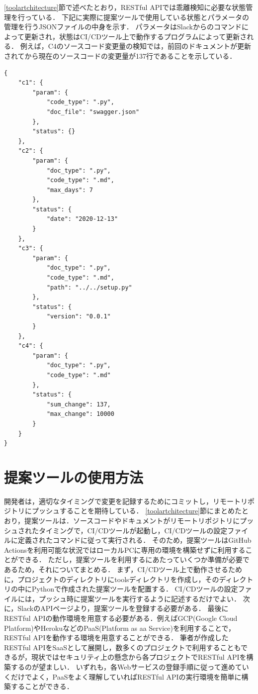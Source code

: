 \ref{toolartchitecture}節で述べたとおり，RESTful APIでは乖離検知に必要な状態管理を行っている．
下記に実際に提案ツールで使用している状態とパラメータの管理を行うJSONファイルの中身を示す．
パラメータはSlackからのコマンドによって更新され，状態はCI/CDツール上で動作するプログラムによって更新される．
例えば，C4のソースコード変更量の検知では，前回のドキュメントが更新されてから現在のソースコードの変更量が137行であることを示している．
\begin{lstlisting}[caption=状態とパラメメータの管理の例, label=status]
{
    "c1": {
        "param": {
            "code_type": ".py",
            "doc_file": "swagger.json"
        },
        "status": {}
    },
    "c2": {
        "param": {
            "doc_type": ".py",
            "code_type": ".md",
            "max_days": 7
        },
        "status": {
            "date": "2020-12-13"
        }
    },
    "c3": {
        "param": {
            "doc_type": ".py",
            "code_type": ".md",
            "path": "../../setup.py"
        },
        "status": {
            "version": "0.0.1"
        }
    },
    "c4": {
        "param": {
            "doc_type": ".py",
            "code_type": ".md"
        },
        "status": {
            "sum_change": 137,
            "max_change": 10000
        }
    }
}
\end{lstlisting}
    

\section{提案ツールの使用方法}
開発者は，適切なタイミングで変更を記録するためにコミットし，リモートリポジトリにプッシュすることを期待している．
\ref{toolartchitecture}節にまとめたとおり，提案ツールは．ソースコードやドキュメントがリモートリポジトリにプッシュされたタイミングで，CI/CDツールが起動し，CI/CDツールの設定ファイルに定義されたコマンドに従って実行される．
そのため，提案ツールはGitHub Actionsを利用可能な状況ではローカルPCに専用の環境を構築せずに利用することができる．
ただし，提案ツールを利用するにあたっていくつか準備が必要であるため，それについてまとめる．
まず，CI/CDツール上で動作させるために，プロジェクトのディレクトリにtoolsディレクトリを作成し，そのディレクトリの中にPythonで作成された提案ツールを配置する．
CI/CDツールの設定ファイルには，プッシュ時に提案ツールを実行するように記述するだけでよい．
次に，SlackのAPIページより，提案ツールを登録する必要がある．
最後にRESTful APIの動作環境を用意する必要がある．例えばGCP(Google Cloud Platform)\cite{gcp}やHeroku\cite{heroku}などのPaaS(Platform as aa Service)を利用することで，RESTful APIを動作する環境を用意することができる．
筆者が作成したRESTful APIをSaaSとして展開し，数多くのプロジェクトで利用することもできるが，現状ではセキュリティ上の懸念から各プロジェクトでRESTful APIを構築するのが望ましい．
いずれも，各Webサービスの登録手順に従って進めていくだけでよく，PaaSをよく理解していればRESTful APIの実行環境を簡単に構築することができる．

